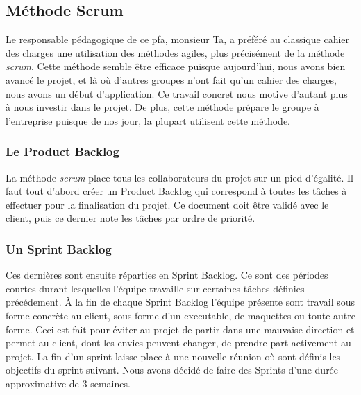 \subsection{Méthode Scrum}
Le responsable pédagogique de ce pfa, monsieur Ta, a préféré au classique cahier des charges une utilisation des méthodes agiles, plus précisément de la méthode \textit{scrum}.  Cette méthode semble être efficace
puisque aujourd'hui, nous avons bien avancé le projet, et là où d'autres
groupes n'ont fait qu'un cahier des charges, nous avons un début
d'application. Ce travail concret nous motive d'autant plus à nous
investir dans le projet. De plus, cette méthode prépare le groupe à
l'entreprise puisque de nos jour, la plupart utilisent cette méthode.



\subsubsection*{Le Product Backlog}
La méthode \textit{scrum} place tous les collaborateurs du projet sur un pied d'égalité. Il faut tout d'abord créer un Product Backlog qui correspond à toutes les tâches à effectuer pour la finalisation du projet.
Ce document doit être validé avec le client, puis ce dernier note les tâches par ordre de priorité.

\subsubsection*{Un Sprint Backlog}
Ces dernières sont ensuite réparties en Sprint Backlog. Ce sont des périodes courtes durant lesquelles l'équipe travaille sur certaines tâches définies précédement. 
À la fin de chaque Sprint Backlog l'équipe présente sont travail sous forme concrète au client, sous forme d'un executable, de maquettes ou toute autre forme.
Ceci est fait pour éviter au projet de partir dans une mauvaise direction et permet au client, dont les envies peuvent changer, de prendre part activement au projet.
La fin d'un sprint laisse place à une nouvelle réunion où sont définis les objectifs du sprint suivant.
Nous avons décidé de faire des Sprints d'une durée approximative de 3 semaines.

